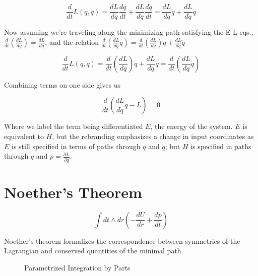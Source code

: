 \documentclass{article}\usepackage[]{graphicx}\usepackage[]{color}
\begin{document}
$$
\frac{d}{dt}L(q,\dot{q})=
\frac{dL}{dq}\frac{dq}{dt}+
\frac{dL}{d\dot{q}}\frac{d\dot{q}}{dt}=
\frac{dL}{dq}\dot{q}+
\frac{dL}{d\dot{q}}\ddot{q}
$$

Now assuming we're traveling along the minimizing path satisfying the E-L eqs., $\frac{d}{dt}\left( \frac{dL}{d\dot{q}}\right) =\frac{dL}{dq}$, and the relation $\frac{d}{dt}\left( \frac{dL}{d\dot{q}}\dot{q}\right) =\frac{d}{dt}\left( \frac{dL}{d\dot{q}} \right) \dot{q}+\frac{dL}{d\dot{q}}\ddot{q}$

$$
\frac{d}{dt}L(q,\dot{q})=\frac{d}{dt}\left( \frac{dL}{d\dot{q}} \right) \dot{q}+\frac{dL}{d\dot{q}}\ddot{q}=\frac{d}{dt}
\left( \frac{dL}{d\dot{q}}\dot{q}\right)
$$

Combining terms on one side gives us

\begin{equation}
\frac{d}{dt}
\left( \frac{dL}{d\dot{q}}\dot{q}-L\right)=0
\end{equation}

Where we label the term being differentiated $E$, the energy of the system. $E$ is equivalent to $H$, but the rebranding emphasizes a change in input coordinates as $E$ is still specified in terms of paths through $q$ and $\dot{q}$; but $H$ is specified in paths through $q$ and $p=\frac{\partial L}{\partial \dot{q}}$. 


\section{Noether's Theorem}


$$
\int dt\wedge dr \left( 
-\frac{dU}{dr}+\frac{dp}{dt}
 \right)
$$


Noether's theorem formalizes the correspondence between symmetries of the Lagrangian and conserved quantities of the minimal path.








\vspace{7cm}
  \begin{center}
    \begin{figure}
   
 
 \vspace{-1cm}

\caption{Parametrized Integration by Parts}

  
\end{figure}  
   \end{center}
\end{document}
